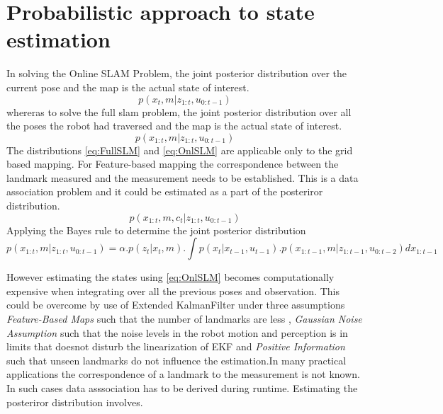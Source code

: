 \section{Probabilistic approach to state estimation}
    In solving the Online SLAM Problem, the joint posterior distribution over the current pose and the map is the actual state of interest.
\begin{equation} \label{eq:OnlSLM}
    p(x_t, m | z_{1:t}, u_{0:t-1})
\end{equation}
whereras to solve the full slam problem, the joint posterior distribution over  all the poses the robot had traversed and the map is the actual state of interest.
\begin{equation} \label{eq:FullSLM}
    p(x_{1:t}, m | z_{1:t}, u_{0:t-1})
\end{equation}
The distributions \ref{eq:FullSLM} and \ref{eq:OnlSLM} are applicable only to the grid based mapping. For Feature-based mapping the correspondence between the landmark measured and the 
measurement needs to be established. This is a data association problem and it could be estimated as a part of the posteriror distribution.
\begin{equation} \label{CorresSLM}
    p(x_{1:t}, m, c_t | z_{1:t}, u_{0:t-1})
\end{equation}
Applying the Bayes rule to determine the joint posterior distribution 
\begin{equation} \label{eq:FullSLMc}
    p(x_{1:t}, m | z_{1:t}, u_{0:t-1}) = \alpha . p(z_t | x_t, m).\int p(x_t| x_{t-1}, u_{t-1}). p(x_{1:t-1}, m | z_{1:t-1}, u_{0:t-2}) dx_{1:t-1}
\end{equation}

However estimating the states using \ref{eq:OnlSLM} becomes computationally expensive when integrating over all the previous poses and observation. This could be overcome by use of Extended KalmanFilter under three assumptions
\textit{Feature-Based Maps} such that the number of landmarks are less , \textit{Gaussian Noise Assumption} such that the noise levels in the robot motion and perception is in limits that doesnot disturb the
linearization of EKF and \textit{ Positive Information} such that unseen landmarks do not influence the estimation.In many practical applications the correspondence of a landmark to the measurement is not known.
In such cases data asssociation has to be derived during runtime. Estimating the posteriror distribution involves.

